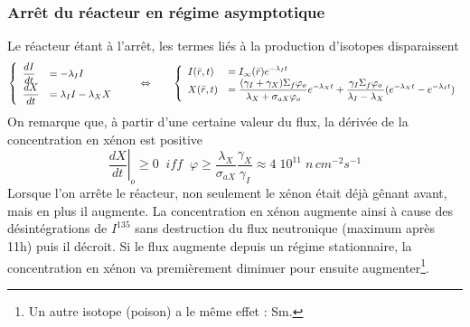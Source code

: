 		\subsubsection{Arrêt du réacteur en régime asymptotique}
		Le réacteur étant à l'arrêt, les termes liés à la production d'isotopes disparaissent
		\begin{equation}
		\left\{\begin{array}{ll}
		\dfrac{{dI}}{{dt}} &= \displaystyle - {\lambda _I}I\\
		\dfrac{{dX}}{{dt}} &\displaystyle= {\lambda _I}I - {\lambda _X}X
		\end{array}\right.\qquad\Leftrightarrow\qquad\left\{\begin{array}{ll}
		I(\bar r,t) &\displaystyle= {I_\infty }(\bar r){e^{ - {\lambda _I}t}}\\
		X(\bar r,t) &\displaystyle= \frac{{({\gamma _I} + {\gamma _X}){\Sigma _f}{\varphi _o}}}{{{\lambda _X} +
		 {\sigma _{aX}}{\varphi _o}}}{e^{ - {\lambda _X}t}} + \frac{{{\gamma _I}{\Sigma _f}{\varphi
		  _o}}}{{{\lambda _I} - {\lambda _X}}}({e^{ - {\lambda _X}t}} - {e^{ - {\lambda _I}t}})
		\end{array}\right.
		\end{equation}
		On remarque que, à partir d'une certaine valeur du flux, la dérivée de la concentration en
		xénon est positive
		\begin{equation}
		{\left. {\frac{{dX}}{{dt}}} \right|_o} \ge 0\;\;iff\;\;\varphi  \ge \frac{{{\lambda _X}}
		}{{{\sigma _{aX}}}}\frac{{{\gamma _X}}}{{{\gamma _I}}} \approx 4\;{10^{11}}\;n\,c{m^{ - 2}}
		{s^{ - 1}}
		\end{equation}
		Lorsque l'on arrête le réacteur, non seulement le xénon était déjà gênant avant, mais en plus
		il augmente. La concentration en xénon augmente ainsi à cause des désintégrations de $I^{135}$ 
		sans destruction du flux neutronique (maximum après 11h) puis il décroit. Si le flux augmente
		depuis un régime stationnaire, la concentration en xénon va premièrement diminuer pour 
		ensuite augmenter\footnote{Un autre isotope (poison) a le même effet : Sm.}.
	
